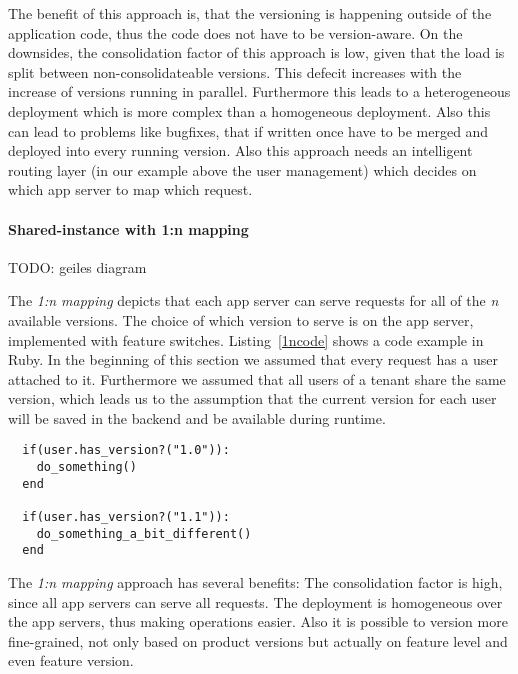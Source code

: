 The benefit of this approach is, that the versioning is happening outside of the application code, thus the code does not have to be version-aware. On the downsides, the consolidation factor of this approach is low, given that the load is split between non-consolidateable versions. This defecit increases with the increase of versions running in parallel. Furthermore this leads to a heterogeneous deployment which is more complex than a homogeneous deployment.  Also this can lead to problems like bugfixes, that if written once have to be merged and deployed into every running version. Also this approach needs an intelligent routing layer (in our example above the user management) which decides on which app server to map which request.

%
%

\paragraph{Shared-instance with 1:n mapping}
TODO: geiles diagram

The \emph{1:n mapping} depicts that each app server can serve requests for all of the \emph{n} available versions. The choice of which version to serve is on the app server, implemented with feature switches. Listing~\ref{1ncode} shows a code example in Ruby. In the beginning of this section we assumed that every request has a user attached to it. Furthermore we assumed that all users of a tenant share the same version, which leads us to the assumption that the current version for each user will be saved in the backend and be available during runtime.

\begin{lstlisting}
  if(user.has_version?("1.0")):
    do_something()
  end
  
  if(user.has_version?("1.1")):
    do_something_a_bit_different()
  end
\end{lstlisting}

The \emph{1:n mapping} approach has several benefits: The consolidation factor is high, since all app servers can serve all requests. The deployment is homogeneous over the app servers, thus making operations easier. Also it is possible to version more fine-grained, not only based on product versions but actually on feature level and even feature version.

